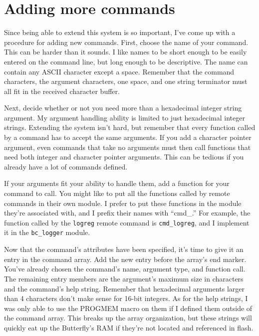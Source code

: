 \clearpage{}
\section{Adding more commands}
Since being able to extend this system is so important, I've come up with a procedure for adding new commands.  First, choose the name of your command.  This can be harder than it sounds.  I like names to be short enough to be easily entered on the command line, but long enough to be descriptive.  The name can contain any ASCII character except a space.  Remember that the command characters, the argument characters, one space, and one string terminator must all fit in the received character buffer.
    
Next, decide whether or not you need more than a hexadecimal integer string argument.  My argument handling ability is limited to just hexadecimal integer strings.  Extending the system isn't hard, but remember that every function called by a command has to accept the same arguments.  If you add a character pointer argument, even commands that take no arguments must then call functions that need both integer and character pointer arguments.  This can be tedious if you already have a lot of commands defined.

If your arguments fit your ability to handle them, add a function for your command to call.  You might like to put all the functions called by remote commands in their own module.  I prefer to put these functions in the module they're associated with, and I prefix their names with ``cmd\_.'' For example, the function called by the \texttt{logreg} remote command is \texttt{cmd\_logreg}, and I implement it in the \texttt{bc\_logger} module.

Now that the command's attributes have been specified, it's time to give it an entry in the command array.  Add the new entry before the array's end marker.  You've already chosen the command's name, argument type, and function call.  The remaining entry members are the argument's maximum size in characters and the command's help string.  Remember that hexadecimal arguments larger than 4 characters don't make sense for 16-bit integers.  As for the help strings, I was only able to use the PROGMEM macro on them if I defined them outside of the command array.  This breaks up the array organization, but these strings will quickly eat up the Butterfly's RAM if they're not located and referenced in flash.  


\clearpage{}
